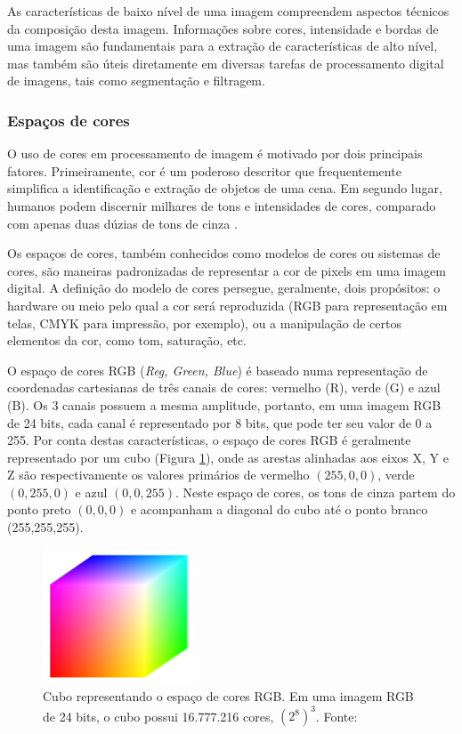As características de baixo nível de uma imagem compreendem aspectos técnicos da composição desta imagem. Informações sobre cores, intensidade e bordas de uma imagem são fundamentais para a extração de características de alto nível, mas também são úteis diretamente em diversas tarefas de processamento digital de imagens, tais como segmentação e filtragem.

\subsubsection*{Espaços de cores}

O uso de cores em processamento de imagem é motivado por dois principais fatores. Primeiramente, cor é um poderoso descritor que frequentemente simplifica a identificação e extração de objetos de uma cena. Em segundo lugar, humanos podem discernir milhares de tons e intensidades de cores, comparado com apenas duas dúzias de tons de cinza \cite{gonzalez:2002}.

Os espaços de cores, também conhecidos como modelos de cores ou sistemas de cores, são maneiras padronizadas de representar a cor de pixels em uma imagem digital. A definição do modelo de cores persegue, geralmente, dois propósitos: o hardware ou meio pelo qual a cor será reproduzida (RGB para representação em telas, CMYK para impressão, por exemplo), ou a manipulação de certos elementos da cor, como tom, saturação, etc.

O espaço de cores RGB (\textit{Reg, Green, Blue}) é baseado numa representação de coordenadas cartesianas de três canais de cores: vermelho (R), verde (G) e azul (B). Os 3 canais possuem a mesma amplitude, portanto, em uma imagem RGB de 24 bits, cada canal é representado por 8 bits, que pode ter seu valor de 0 a 255. Por conta destas características, o espaço de cores RGB é geralmente representado por um cubo (Figura \ref{fig:rgb_cubo}), onde as arestas alinhadas aos eixos X, Y e Z são respectivamente os valores primários de vermelho $(255,0,0)$, verde $(0,255,0)$ e azul $(0,0,255)$. Neste espaço de cores, os tons de cinza partem do ponto preto $(0,0,0)$ e acompanham a diagonal do cubo até o ponto branco (255,255,255).

\begin{figure}[h]
  \centering
  \includegraphics[width=0.4\textwidth]{imgs/rgb_cubo}
  \caption[Cubo do espaço de cores RGB]{Cubo representando o espaço de cores RGB. Em uma imagem RGB de 24 bits, o cubo possui 16.777.216 cores, $(2^8)^3$. Fonte: \cite{gonzalez:2002}}
  \label{fig:rgb_cubo}
\end{figure}

